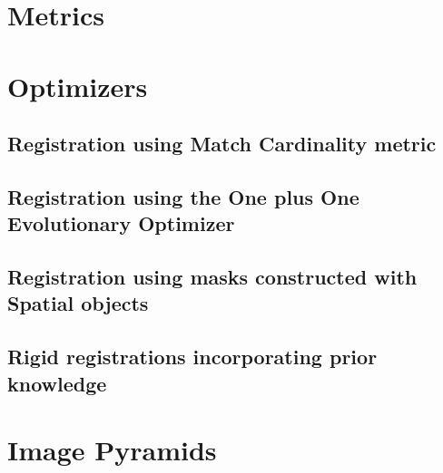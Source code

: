 \clearpage

\section{Metrics}
\label{sec:Metrics}
\ifitkFullVersion

\fi

\clearpage

\section{Optimizers}
\label{sec:Optimizers}
\ifitkFullVersion

\fi



\subsection{Registration using Match Cardinality metric}
\label{sec:RegistrationMatchCardinality}
\ifitkFullVersion

\fi


\subsection{Registration using the One plus One Evolutionary Optimizer}
\label{sec:RegistrationOnePlusOne}
\ifitkFullVersion

\fi



\subsection{Registration using masks constructed with Spatial objects}
\label{sec:RegistrationSpatialObjects}
\ifitkFullVersion

\fi



\subsection{Rigid registrations incorporating prior knowledge}
\label{sec:RegistrationCentered2DTransform}
\ifitkFullVersion

\fi
\clearpage

\section{Image Pyramids}
\label{sec:ImagePyramids}
\ifitkFullVersion

\fi


